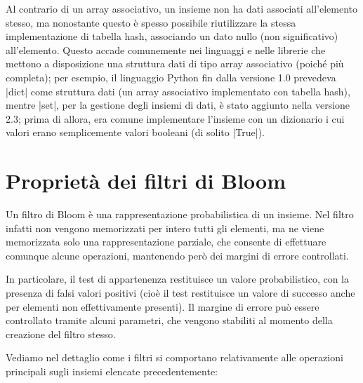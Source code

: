 Al contrario di un array associativo, un insieme non ha dati associati all'elemento stesso, ma
nonostante questo è spesso possibile riutilizzare la stessa implementazione di tabella hash,
associando un dato nullo (non significativo) all'elemento. Questo accade comunemente nei linguaggi e
nelle librerie che mettono a disposizione una struttura dati di tipo array associativo (poiché più
completa); per esempio, il linguaggio Python fin dalla versione 1.0 prevedeva \cverb|dict| come
struttura dati (un array associativo implementato con tabella hash), mentre \cverb|set|, per la
gestione degli insiemi di dati, è stato aggiunto nella versione 2.3; prima di allora, era comune
implementare l'insieme con un dizionario i cui valori erano semplicemente valori booleani (di solito
\cverb|True|).

\section{Proprietà dei filtri di Bloom}

Un filtro di Bloom \cite{bloomfilters} è una rappresentazione probabilistica di un insieme. Nel
filtro infatti non vengono memorizzati per intero tutti gli elementi, ma ne viene memorizzata solo
una rappresentazione parziale, che consente di effettuare comunque alcune operazioni, mantenendo
però dei margini di errore controllati.

In particolare, il test di appartenenza restituisce un valore probabilistico, con la presenza di
falsi valori positivi (cioè il test restituisce un valore di successo anche per elementi non
effettivamente presenti). Il margine di errore può essere controllato tramite alcuni parametri, che
vengono stabiliti al momento della creazione del filtro stesso.

Vediamo nel dettaglio come i filtri si comportano relativamente alle operazioni principali sugli
insiemi elencate precedentemente:

